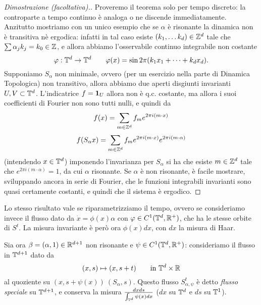 \begin{proof}[Dimostrazione (facoltativa).]
 Proveremo il teorema solo per tempo discreto: la controparte a tempo continuo è analoga o ne discende immediatamente. 
 Anzitutto mostriamo con un unico esempio che se $\alpha$ è risonante la dinamica non è transitiva nè ergodica: 
 infatti in tal caso esiste $(k_1,\dots k_d)\in\mathbb{Z}^d$ tale che $\sum\alpha_j k_j=k_0\in\mathbb{Z}$, e allora abbiamo l'osservabile continuo integrabile non costante
 \[\varphi:\mathbb{T}^d\rightarrow \mathbb{T}^d \qquad \varphi(x)=\sin 2\pi(k_1x_1+\dots+k_dx_d).\]
 Supponiamo $S_\alpha$ non minimale, ovvero (per un esercizio nella parte di Dinamica Topologica) non transitivo, 
 allora abbiamo due aperti disgiunti invarianti $U,V\subset \mathbb{T}^d$. L'indicatrice $f=\bm{1}_U$ allora non è q.c. costante, ma allora i suoi coefficienti di Fourier
 non sono tutti nulli, e quindi da
 \[f(x)=\sum_{m\in \mathbb{Z}^d} f_m e^{2\pi i (m\cdot x)}\]
 \[f(S_\alpha x )=\sum_{m\in \mathbb{Z}^d} f_m e^{2\pi i (m\cdot x)} e^{2\pi i (m\cdot \alpha)}\]
 (intendendo $x\in \mathbb{T}^d$) imponendo l'invarianza per $S_\alpha$ si ha che esiste $m\in\mathbb{Z}^d$ tale che $e^{2\pi i (m\cdot \alpha)}=1$, da cui $\alpha$ risonante.
 Se $\alpha$ è non risonante, è facile mostrare, sviluppando ancora in serie di Fourier, che le funzioni integrabili invarianti sono quasi certamente costanti,
 e quindi che il sistema è ergodico.
\end{proof}

























Lo stesso risultato vale se riparametrizziamo il tempo, ovvero se consideriamo invece il flusso dato da $\dot x=\phi(x)\alpha$ con $\varphi\in C^1(\mathbb{T}^d,\mathbb{R}^+)$, che ha le stesse orbite di $S^t$. La misura invariante è però ora $\phi(x)dx$, con $dx$ la misura di Haar.

Sia ora $\beta=(\alpha,1)\in \mathbb{R}^{d+1}$ non risonante e $\psi\in C^1(\mathbb{T}^d,\mathbb{R}^+)$: consideriamo il flusso in $\mathbb{T}^{d+1}$ dato da 
\[(x,s)\mapsto(x,s+t) \qquad \mbox{in }\mathbb{T}^d\times \mathbb{R}\]
al quoziente su $(x,s+\psi(x))~(S_\alpha,s)$. Questo flusso $S^t_{\alpha,\psi}$ è detto \emph{flusso speciale} su $\mathbb{T}^{d+1}$, e conserva la misura $\frac{dxds}{\int_{\mathbb{T}^d}\psi(x)dx}$ ($dx$ su $\mathbb{T}^d$ e $ds$ su $\mathbb{T}^1$).

